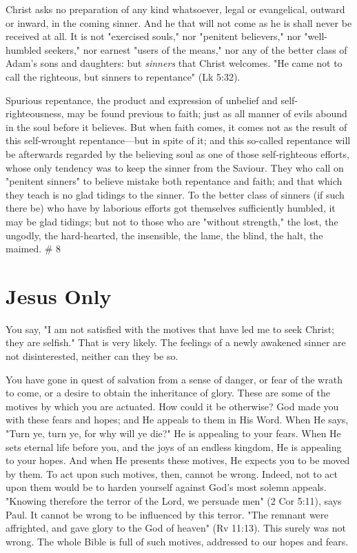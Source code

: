 \documentclass[
]{book}
\begin{document}
Christ asks no preparation of any kind whatsoever, legal or evangelical, outward or inward, in the coming sinner. And he that will not come as he is shall never be received at all. It is not "exercised souls," nor "penitent believers," nor "well-humbled seekers," nor earnest "users of the means," nor any of the better class of Adam's sons and daughters: but \emph{sinners} that Christ welcomes. "He came not to call the righteous, but sinners to repentance" (Lk 5:32).

Spurious repentance, the product and expression of unbelief and self-righteousness, may be found previous to faith; just as all manner of evils abound in the soul before it believes. But when faith comes, it comes not as the result of this self-wrought repentance---but in spite of it; and this so-called repentance will be afterwards regarded by the believing soul as one of those self-righteous efforts, whose only tendency was to keep the sinner from the Saviour. They who call on "penitent sinners" to believe mistake both repentance and faith; and that which they teach is no glad tidings to the sinner. To the better class of sinners (if such there be) who have by laborious efforts got themselves sufficiently humbled, it may be glad tidings; but not to those who are "without strength," the lost, the ungodly, the hard-hearted, the insensible, the lame, the blind, the halt, the maimed.
\# 8

\hypertarget{jesus-only}{%
\chapter{Jesus Only}\label{jesus-only}}

You say, "I am not satisfied with the motives that have led me to seek Christ; they are selfish." That is very likely. The feelings of a newly awakened sinner are not disinterested, neither can they be so.

You have gone in quest of salvation from a sense of danger, or fear of the wrath to come, or a desire to obtain the inheritance of glory. These are some of the motives by which you are actuated. How could it be otherwise? God made you with these fears and hopes; and He appeals to them in His Word. When He says, "Turn ye, turn ye, for why will ye die?" He is appealing to your fears. When He sets eternal life before you, and the joys of an endless kingdom, He is appealing to your hopes. And when He presents these motives, He expects you to be moved by them. To act upon such motives, then, cannot be wrong. Indeed, not to act upon them would be to harden yourself against God's most solemn appeals. "Knowing therefore the terror of the Lord, we persuade men" (2 Cor 5:11), says Paul. It cannot be wrong to be influenced by this terror. "The remnant were affrighted, and gave glory to the God of heaven" (Rv 11:13). This surely was not wrong. The whole Bible is full of such motives, addressed to our hopes and fears.
\end{document}
